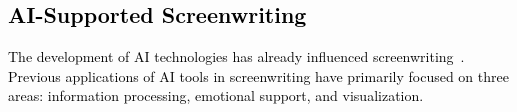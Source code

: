 \subsection{\textcolor{black}{AI-Supported Screenwriting}}

\textcolor{black}{The development of AI technologies has already influenced screenwriting~\cite{batty2015screenwriter, anguiano2023hollywood}. Previous applications of AI tools in screenwriting have primarily focused on three areas: information processing, emotional support, and visualization.}


